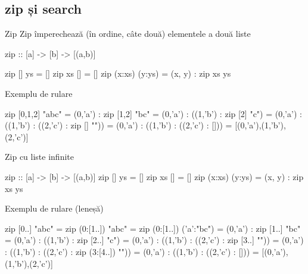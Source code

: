 \documentclass[xcolor=pdftex,romanian,colorlinks]{beamer}
\begin{document}
\subsection{zip și search}
\begin{frame}[fragile]{Zip}
Zip împerechează (în ordine, câte două) elementele a două liste 
\begin{asciihs}
zip :: [a] -> [b] -> [(a,b)]
\end{asciihs}
\vspace{-2ex}
\begin{asciihs}
zip [] ys = []
zip xs [] = []
zip (x:xs) (y:ys) = (x, y) : zip xs ys
\end{asciihs}

\begin{block}{Exemplu de rulare}
\begin{asciihs}
zip [0,1,2] "abc"
  = (0,'a') : zip [1,2] "bc"
  = (0,'a') : ((1,'b') : zip [2] "c")
  = (0,'a') : ((1,'b') : ((2,'c') : zip [] ""))
  = (0,'a') : ((1,'b') : ((2,'c') : []))
  = [(0,'a'),(1,'b'),(2,'c')]
\end{asciihs}
\end{block}
\end{frame}

\begin{frame}[fragile]{Zip cu liste infinite}
\begin{asciihs}
zip :: [a] -> [b] -> [(a,b)]
zip [] ys = []
zip xs [] = []
zip (x:xs) (y:ys) = (x, y) : zip xs ys
\end{asciihs}

\begin{block}{Exemplu de rulare (leneșă)}
\begin{asciihs}
zip [0..] "abc"
  = zip (0:[1..]) "abc"
  = zip (0:[1..]) ('a':"bc")
  = (0,'a') : zip [1..] "bc"
  = (0,'a') : ((1,'b') : zip [2..] "c")
  = (0,'a') : ((1,'b') : ((2,'c') : zip [3..] ""))
  = (0,'a') : ((1,'b') : ((2,'c') : zip (3:[4..]) ""))
  = (0,'a') : ((1,'b') : ((2,'c') : []))
  = [(0,'a'),(1,'b'),(2,'c')]
\end{asciihs}
\end{block}

\end{frame}
\end{document}
